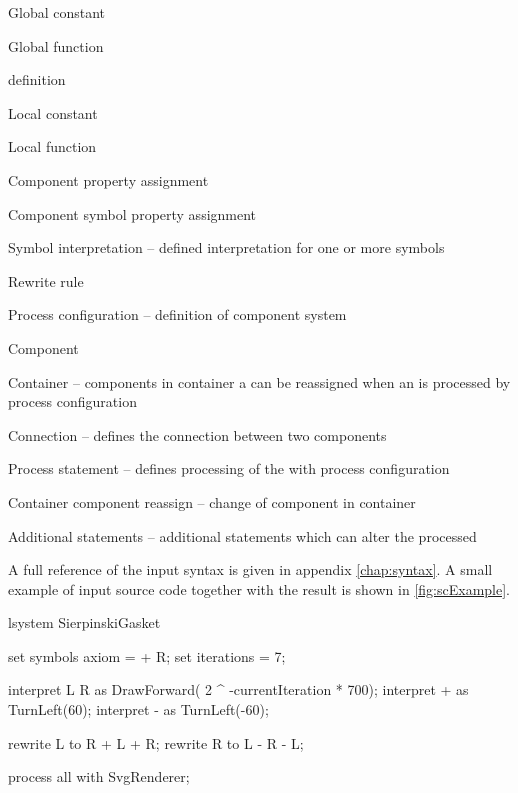 \begin{itemize*}
	\item Global constant
	\item Global function
	\item \lsystem definition
		\begin{itemize*}
			\item Local constant
			\item Local function
			\item Component property assignment
			\item Component symbol property assignment
			\item Symbol interpretation -- defined interpretation for one or more \lsystem symbols
			\item Rewrite rule
		\end{itemize*}
	\item Process configuration -- definition of component system
		\begin{itemize*}
			\item Component
			\item Container -- components in container a can be reassigned when an \lsystem is processed by process configuration
			\item Connection -- defines the connection between two components
		\end{itemize*}
	\item Process statement -- defines processing of the \lsystem with process configuration
		\begin{itemize*}
			\item Container component reassign -- change of component in container
			\item Additional \lsystem statements -- additional \lsystem statements which can alter the processed \lsystem
		\end{itemize*}
\end{itemize*}

A full reference of the input syntax is given in appendix \ref{chap:syntax}.
A small example of input source code together with the result is shown in \autoref{fig:scExample}.

\newsavebox{\lstBoxParams}
\begin{lrbox}{\lstBoxParams}
\begin{Lsystem50}
lsystem SierpinskiGasket {
	set symbols axiom = + R;
	set iterations = 7;

	interpret L R as DrawForward(
		2 ^ -currentIteration
		* 700);
	interpret + as TurnLeft(60);
	interpret - as TurnLeft(-60);

	rewrite L to R + L + R;
	rewrite R to L - R - L;
}
process all with SvgRenderer;
\end{Lsystem50}
\end{lrbox}

